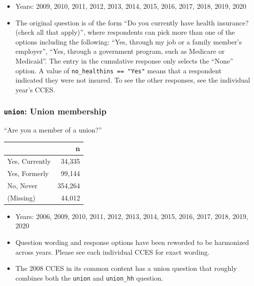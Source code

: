 \documentclass[10pt,article,oneside]{memoir}
\theoremstyle{definition}
\begin{document}
\begin{itemize}
\tightlist
\item
  Years: 2009, 2010, 2011, 2012, 2013, 2014, 2015, 2016, 2017, 2018,
  2019, 2020
\item
  The original question is of the form ``Do you currently have health
  insurance? (check all that apply)'', where respondents can pick more
  than one of the options including the following: ``Yes, through my job
  or a family member's employer'', ``Yes, through a government program,
  such as Medicare or Medicaid''. The entry in the cumulative response
  only selects the ``None'' option. A value of
  \texttt{no\_healthins\ ==\ "Yes"} means that a respondent indicated
  they were not insured. To see the other responses, see the individual
  year's CCES.
\end{itemize}

\hypertarget{union-union-membership}{%
\subsubsection{\texorpdfstring{\texttt{union}: Union
membership}{union: Union membership}}\label{union-union-membership}}

``Are you a member of a union?''

\begin{table}[H]
\centering
\begin{tabular}[t]{lr}
\toprule
 & n\\
\midrule
Yes, Currently & 34,335\\
Yes, Formerly & 99,144\\
No, Never & 354,264\\
(Missing) & 44,012\\
\bottomrule
\end{tabular}
\end{table}

\begin{itemize}
\tightlist
\item
  Years: 2006, 2009, 2010, 2011, 2012, 2013, 2014, 2015, 2016, 2017,
  2018, 2019, 2020
\item
  Question wording and response options have been reworded to be
  harmonized across years. Please see each individual CCES for exact
  wording.
\item
  The 2008 CCES in its common content has a union question that roughly
  combines both the \texttt{union} and \texttt{union\_hh} question.
\end{itemize}
\end{document}
